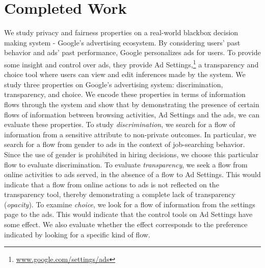 \documentclass[10pt, onecolumn]{report}
\begin{document}
\chapter{Completed Work}


We study privacy and fairness properties on a real-world blackbox decision making 
system - Google's advertising ecosystem. 
By considering users' past behavior and ads' past performance, 
Google personalizes ads for users. To provide some insight and control over ads, they 
provide Ad Settings,\footnote{\url{www.google.com/settings/ads}}
a transparency and choice tool where users can view and edit
inferences made by the system. 
We study three properties on Google's advertising system: 
discrimination, transparency, and choice. We encode these properties in terms 
of information flows through the system and show that by 
demonstrating the presence of certain flows of information between browsing activities, 
Ad Settings and the ads, we can evaluate these properties. 
To study \emph{discrimination}, we search for a flow of 
information from a sensitive attribute to non-private outcomes. In particular, 
we search for a flow from gender to ads in the context of job-searching behavior. Since 
the use of gender is prohibited in hiring decisions, we choose this particular flow to 
evaluate discrimination. To evaluate \emph{transparency}, 
we seek a flow from online activities to ads served, in the absence of a flow to Ad Settings. 
This would indicate that a flow from online actions to ads is not reflected on the 
transparency tool, thereby demonstrating a complete lack of 
transparency (\emph{opacity}). 
To examine \emph{choice}, we look for a flow of information 
from the settings page to the ads. This would indicate that the control tools
on Ad Settings have some effect. We also evaluate whether the effect corresponds
to the preference indicated by looking for a specific kind of flow. 
\end{document}
